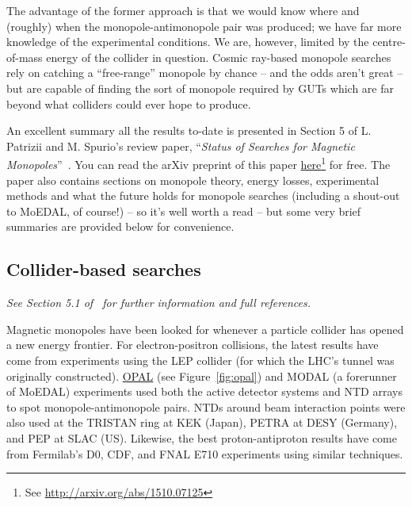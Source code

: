 The advantage of the former approach is that we would know where and
(roughly) when the monopole-antimonopole pair was produced;
we have far more knowledge of the experimental conditions.
We are, however, limited by the centre-of-mass energy of the
collider in question.
Cosmic ray-based monopole searches rely on catching a ``free-range''
monopole by chance -- and the odds aren't great -- but are capable of
finding the sort of monopole required by \acp{GUT} which
are far beyond what colliders could ever hope to produce.

An excellent summary all the results to-date is presented in
Section 5 of L. Patrizii and M. Spurio’s review paper,
``{\em Status of Searches for Magnetic Monopoles}''~\cite{Patrizii2015}.
You can read the arXiv preprint of this paper
\href{http://arxiv.org/abs/1510.07125}{here}\footnote{%
See \href{http://arxiv.org/abs/1510.07125}{http://arxiv.org/abs/1510.07125}} for free.
The paper also contains sections on monopole theory,
energy losses, experimental methods and what the future holds for monopole
searches (including a shout-out to MoEDAL, of course!) -- so it's well worth
a read -- but some very brief summaries are provided below for convenience.


\subsection{Collider-based searches}
\label{sec:searchescollider}
{\em See Section 5.1 of~\cite{Patrizii2015} for further information and
full references.}

Magnetic monopoles have been looked for whenever a particle collider has
opened a new energy frontier.
For electron-positron collisions,
the latest results have come from experiments using the
\ac{LEP} collider (for which the LHC's tunnel was originally constructed).
%
\href{http://opal.web.cern.ch/Opal/}{OPAL} (see Figure~\ref{fig:opal})
and \acs{MODAL} (a forerunner of MoEDAL) experiments used both the active 
detector systems and \ac{NTD} arrays to spot monopole-antimonopole pairs.  
\acp{NTD} around beam interaction points were also used at the TRISTAN 
ring at \acs{KEK} (Japan), PETRA at DESY (Germany), and \acs{PEP} at
\acs{SLAC} (US).
Likewise, the best proton-antiproton results have come from Fermilab's
D0, \acs{CDF}, and FNAL E710 experiments using similar techniques.

